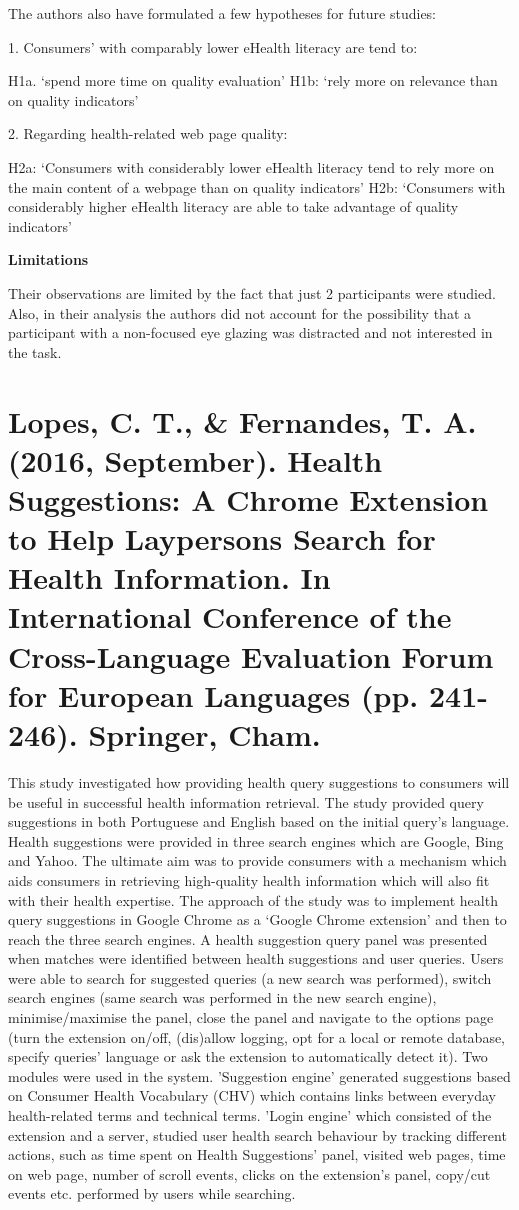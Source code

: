 \documentclass[]{article}
\begin{document}
The authors also have formulated a few hypotheses for future studies:

1. Consumers’ with comparably lower eHealth literacy are tend to: 

H1a. ‘spend more time on quality evaluation’
H1b: ‘rely more on relevance than on quality indicators’  

2. Regarding health-related web page quality:

H2a: ‘Consumers with considerably lower eHealth literacy tend to rely more on the main content of a webpage than on quality indicators’
H2b: ‘Consumers with considerably higher eHealth literacy are able to take advantage of quality indicators’ 

\textbf{Limitations}

Their observations are limited by the fact that just 2 participants were studied. Also, in their analysis the authors did not account for the possibility that a participant with a non-focused eye glazing was distracted and not interested in the task.

\section{Lopes, C. T., \& Fernandes, T. A. (2016, September). Health Suggestions: A Chrome Extension to Help Laypersons Search for Health Information. In International Conference of the Cross-Language Evaluation Forum for European Languages (pp. 241-246). Springer, Cham.}

This study investigated how providing health query suggestions to consumers will be useful in successful health information retrieval. The study provided query suggestions in both Portuguese and English based on the initial query's language. Health suggestions were provided in three search engines which are Google, Bing and Yahoo. The ultimate aim was to provide consumers with a mechanism which aids consumers in retrieving high-quality health information which will also fit with their health expertise. The approach of the study was to implement health query suggestions in Google Chrome as a ‘Google Chrome extension’ and then to reach the three search engines. A health suggestion query panel was presented when matches were identified between health suggestions and user queries. Users were able to search for suggested queries (a new search was performed), switch search engines (same search was performed in the new search engine), minimise/maximise the panel, close the panel and navigate to the options page (turn the extension on/off, (dis)allow logging, opt for a local or remote database, specify queries’ language or ask the extension to automatically detect it). Two modules were used in the system. 'Suggestion engine' generated suggestions based on Consumer Health Vocabulary (CHV) which contains links between everyday health-related terms and technical terms. 'Login engine' which consisted of the extension and a server, studied user health search behaviour by tracking different actions, such as time spent on Health Suggestions’ panel, visited web pages, time on web page, number of scroll events, clicks on the extension’s panel, copy/cut events etc. performed by users while searching. 
\end{document}
